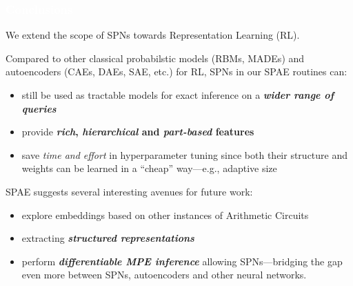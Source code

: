 \documentclass[xcolor={usenames,dvipsnames,svgnames}, compress]{beamer}
\newcommand{\highlighttext}[2][yellow]{{\colorbox{#1}{\textcolor{white}{#2}}}}
\begin{document}
\begin{frame}[t]
  \frametitle{\highlighttext[peas1]{Conclusions}}
  \footnotesize
  We extend the scope of SPNs towards Representation
Learning (RL). \par
%
Compared to other classical probabilstic models (\textsf{RBMs},
\textsf{MADEs}) and autoencoders (\textsf{CAEs}, \textsf{DAEs},
\textsf{SAE}, etc.) for
RL, SPNs in our SPAE routines can:
\begin{itemize}
\item still be used as tractable models for exact inference on a \emph{\textbf{wider
  range of queries}}
\item provide \textbf{\emph{rich}, \emph{hierarchical} and \emph{part-based}
  features}
  \item save \emph{time and effort} in hyperparameter tuning
since both their structure and weights can be learned
 in a ``cheap'' way---e.g., adaptive size
\end{itemize}\bigskip

SPAE  suggests  several  interesting  avenues for future work:
\begin{itemize}
\item explore embeddings
  based on other instances of Arithmetic Circuits~\parencite{Darwiche2009}
\item extracting \emph{\textbf{structured
  representations}}
  \item perform \emph{\textbf{differentiable MPE inference}} allowing SPNs---bridging the gap even more between SPNs, autoencoders
and other neural networks.
\end{itemize}
\end{frame}
\end{document}
